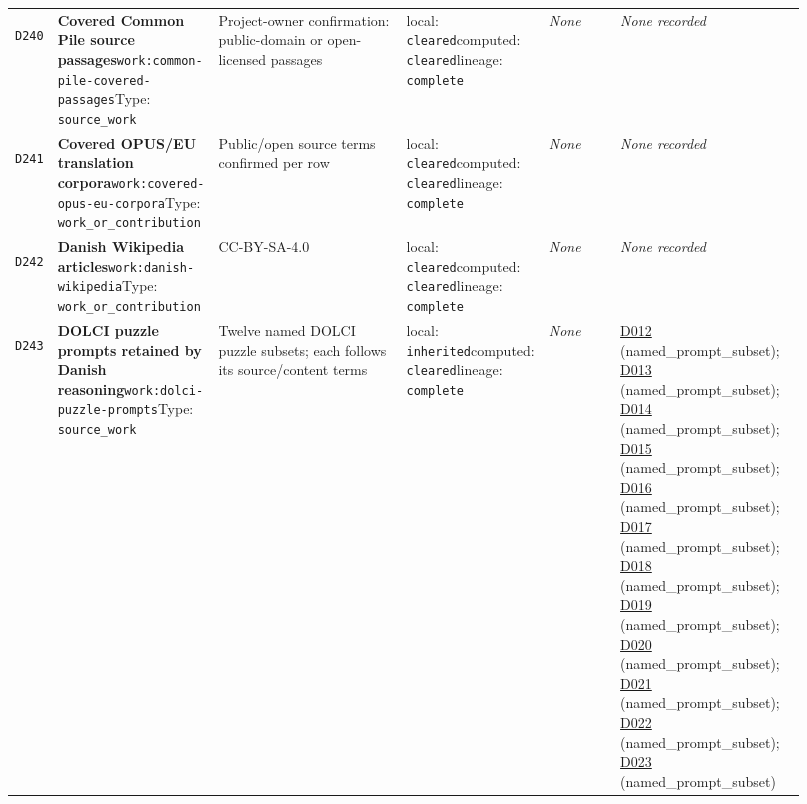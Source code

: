 \documentclass[9pt,a4paper]{article}
\newcommand{\depid}[1]{\hypertarget{dep:#1}{\texttt{#1}}}
\begin{document}
\begin{landscape}
\begin{longtable}{@{}L{0.035\linewidth}L{0.185\linewidth}L{0.27\linewidth}L{0.09\linewidth}L{0.10\linewidth}L{0.24\linewidth}@{}}
\depid{D240} & \textbf{Covered Common Pile source passages}\newline \nolinkurl{work:common-pile-covered-passages}\newline Type: \texttt{source\_work} & Project-owner confirmation: public-domain or open-licensed passages & local: \texttt{cleared}\newline computed: \texttt{cleared}\newline lineage: \texttt{complete} & \textit{None} & \textit{None recorded} \\
\depid{D241} & \textbf{Covered OPUS/EU translation corpora}\newline \nolinkurl{work:covered-opus-eu-corpora}\newline Type: \texttt{work\_or\_contribution} & Public/open source terms confirmed per row & local: \texttt{cleared}\newline computed: \texttt{cleared}\newline lineage: \texttt{complete} & \textit{None} & \textit{None recorded} \\
\depid{D242} & \textbf{Danish Wikipedia articles}\newline \nolinkurl{work:danish-wikipedia}\newline Type: \texttt{work\_or\_contribution} & CC-BY-SA-4.0 & local: \texttt{cleared}\newline computed: \texttt{cleared}\newline lineage: \texttt{complete} & \textit{None} & \textit{None recorded} \\
\depid{D243} & \textbf{DOLCI puzzle prompts retained by Danish reasoning}\newline \nolinkurl{work:dolci-puzzle-prompts}\newline Type: \texttt{source\_work} & Twelve named DOLCI puzzle subsets; each follows its source/content terms & local: \texttt{inherited}\newline computed: \texttt{cleared}\newline lineage: \texttt{complete} & \textit{None} & \hyperlink{dep:D012}{D012} (named\_prompt\_subset); \hyperlink{dep:D013}{D013} (named\_prompt\_subset); \hyperlink{dep:D014}{D014} (named\_prompt\_subset); \hyperlink{dep:D015}{D015} (named\_prompt\_subset); \hyperlink{dep:D016}{D016} (named\_prompt\_subset); \hyperlink{dep:D017}{D017} (named\_prompt\_subset); \hyperlink{dep:D018}{D018} (named\_prompt\_subset); \hyperlink{dep:D019}{D019} (named\_prompt\_subset); \hyperlink{dep:D020}{D020} (named\_prompt\_subset); \hyperlink{dep:D021}{D021} (named\_prompt\_subset); \hyperlink{dep:D022}{D022} (named\_prompt\_subset); \hyperlink{dep:D023}{D023} (named\_prompt\_subset) \\

\end{longtable}
\end{landscape}
\end{document}
